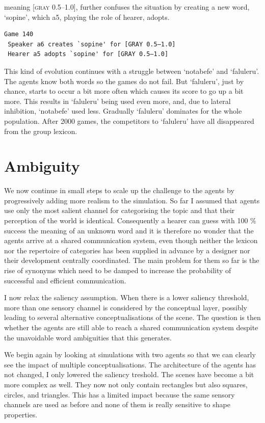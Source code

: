 meaning [\textsc{gray} 0.5–1.0], further confuses the situation by 
creating a new word, `sopine', which {\bfshape  a5}, playing
the role of hearer, adopts. 
\begin{verbatim}
Game 140
 Speaker a6 creates `sopine' for [GRAY 0.5–1.0]
 Hearer a5 adopts `sopine' for [GRAY 0.5–1.0]
\end{verbatim}
This kind of evolution continues with a struggle between 
`notabefe' and `faluleru'. The agents know both 
words so the games do not fail. But `faluleru', 
just by chance, starts to occur a bit more often
which causes its score to go up a bit more. 
This results in `faluleru' being used even more, 
and, due to lateral inhibition, `notabefe' used 
less. Gradually `faluleru' dominates for 
the whole population. 
After 2000 games, the competitors to `faluleru' have 
all disappeared from the group lexicon. 

\section{Ambiguity} 

We now continue in small steps to scale up the
challenge to the agents by progressively 
adding more realism to the simulation. So far I 
assumed that agents use only 
the most salient channel for categorising the topic
and that their perception of the world is identical.
Consequently a hearer can guess with 100 \% success the
meaning of an unknown word and 
it is therefore no wonder that the agents arrive at a 
shared communication system, 
even though neither the lexicon nor the repertoire
of categories has been supplied in advance by a 
designer nor their development centrally
coordinated. The main problem for them so far is 
the rise of synonyms which need to be damped to 
increase the probability of successful and 
efficient communication. 

I now relax the saliency assumption. When 
there is a lower saliency threshold, more than one
sensory channel is considered by the conceptual 
layer, possibly leading to several alternative
conceptualisations of the scene. The question is 
then whether the agents are still able to reach 
a shared communication system despite the unavoidable
word ambiguities that this generates. 

We begin again by looking at simulations
with two agents so that we 
can clearly see the impact of multiple conceptualisations. 
The architecture of the agents has not changed, I only 
lowered the saliency treshold. 
The scenes have become a bit more complex as well. They 
now not only contain rectangles but also squares, circles, 
and triangles. This has a limited impact because the 
same sensory channels are used as before and none of them 
is really sensitive to shape properties. 


